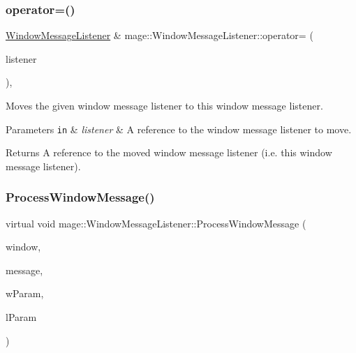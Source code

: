 \subsubsection{\texorpdfstring{operator=()}{operator=()}\hspace{0.1cm}{\footnotesize\ttfamily [2/2]}}
{\footnotesize\ttfamily \mbox{\hyperlink{classmage_1_1_window_message_listener}{Window\+Message\+Listener}} \& mage\+::\+Window\+Message\+Listener\+::operator= (\begin{DoxyParamCaption}\item[{\mbox{\hyperlink{classmage_1_1_window_message_listener}{Window\+Message\+Listener}} \&\&}]{listener }\end{DoxyParamCaption})\hspace{0.3cm}{\ttfamily [default]}, {\ttfamily [noexcept]}}

Moves the given window message listener to this window message listener.


\begin{DoxyParams}[1]{Parameters}
\mbox{\tt in}  & {\em listener} & A reference to the window message listener to move. \\
\hline
\end{DoxyParams}
\begin{DoxyReturn}{Returns}
A reference to the moved window message listener (i.\+e. this window message listener). 
\end{DoxyReturn}
\mbox{\label{classmage_1_1_window_message_listener_a79f2782fa7bd3d1b50cf62cdd3f5c549}} 
\subsubsection{\texorpdfstring{Process\+Window\+Message()}{ProcessWindowMessage()}}
{\footnotesize\ttfamily virtual void mage\+::\+Window\+Message\+Listener\+::\+Process\+Window\+Message (\begin{DoxyParamCaption}\item[{\mbox{[}\mbox{[}maybe\+\_\+unused\mbox{]} \mbox{]} \mbox{\hyperlink{namespacemage_a8769f9d670d6b585ea306cb1062af94b}{Not\+Null}}$<$ H\+W\+ND $>$}]{window,  }\item[{U\+I\+NT}]{message,  }\item[{\mbox{[}\mbox{[}maybe\+\_\+unused\mbox{]} \mbox{]} W\+P\+A\+R\+AM}]{w\+Param,  }\item[{\mbox{[}\mbox{[}maybe\+\_\+unused\mbox{]} \mbox{]} L\+P\+A\+R\+AM}]{l\+Param }\end{DoxyParamCaption})\hspace{0.3cm}{\ttfamily [pure virtual]}}

